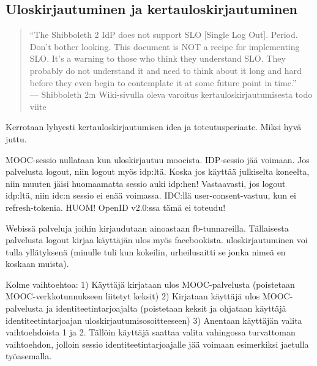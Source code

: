 \documentclass[finnish,gradu]{tktltiki}
\begin{document}
  \subsection{Uloskirjautuminen ja kertauloskirjautuminen} %
  \label{sub:kertauloskirjautuminen}
    \begin{quote}
      ``The Shibboleth 2 IdP does not support SLO [Single Log Out]. Period. Don't bother looking. This document is NOT a recipe for implementing SLO. It's a warning to those who think they understand SLO. They probably do not understand it and need to think about it long and hard before they even begin to contemplate it at some future point in time.''
    \\--- Shibboleth 2:n Wiki-sivulla oleva varoitus kertauloskirjautumisesta  todo viite
    \end{quote}

  Kerrotaan lyhyesti kertauloskirjautumisen idea ja toteutusperiaate. Miksi hyvä juttu.

  MOOC-sessio nullataan kun uloskirjautuu moocista. IDP-sessio jää voimaan. Jos palvelusta logout, niin logout myös idp:ltä. Koska jos käyttää julkiselta koneelta, niin muuten jäisi huomaamatta sessio auki idp:hen! Vastaavasti, jos logout idp:ltä, niin idc:n sessio ei enää voimassa. IDC:llä user-consent-vastuu, kun ei refresh-tokenia. HUOM! OpenID v2.0:ssa tämä ei toteudu!

  Webissä palveluja joihin kirjaudutaan ainoastaan fb-tunnareilla. Tällaisesta palvelusta logout kirjaa käyttäjän ulos myös facebookista. uloskirjautuminen voi tulla yllätyksenä (minulle tuli kun kokeilin, urheilusaitti se jonka nimeä en koskaan muista).

  Kolme vaihtoehtoa:
  1) Käyttäjä kirjataan ulos MOOC-palvelusta (poistetaan MOOC-verkkotunnukseen liitetyt keksit)
  2) Kirjataan käyttäjä ulos MOOC-palvelusta ja identiteetintarjoajalta (poistetaan keksit ja ohjataan käyttäjä identiteetintarjoajan uloskirjautumisosoitteeseen)
  3) Anentaan käyttäjän valita vaihtoehdoista 1 ja 2. Tällöin käyttäjä saattaa valita vahingossa turvattoman vaihtoehdon, jolloin sessio identiteetintarjoajalle jää voimaan esimerkiksi jaetulla työasemalla.
\end{document}
